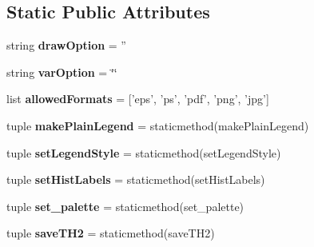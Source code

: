 \subsection*{Static Public Attributes}
\begin{CompactItemize}
\item 
\hypertarget{classtools_1_1DrawHelper_1_1Helper_4b36ab3b56f94874cb1c43e90a85695d}{
string \textbf{drawOption} = ''}
\label{classtools_1_1DrawHelper_1_1Helper_4b36ab3b56f94874cb1c43e90a85695d}

\item 
\hypertarget{classtools_1_1DrawHelper_1_1Helper_f183ed5a45610502bd5e12e7d6d8b09e}{
string \textbf{varOption} = \char`\"{}\char`\"{}}
\label{classtools_1_1DrawHelper_1_1Helper_f183ed5a45610502bd5e12e7d6d8b09e}

\item 
\hypertarget{classtools_1_1DrawHelper_1_1Helper_b198b72b77c9344732c8f06407bf02b0}{
list \textbf{allowedFormats} = \mbox{[}'eps', 'ps', 'pdf', 'png', 'jpg'\mbox{]}}
\label{classtools_1_1DrawHelper_1_1Helper_b198b72b77c9344732c8f06407bf02b0}

\item 
\hypertarget{classtools_1_1DrawHelper_1_1Helper_15871669c388b1d7217da9e5d81769bf}{
tuple \textbf{makePlainLegend} = staticmethod(makePlainLegend)}
\label{classtools_1_1DrawHelper_1_1Helper_15871669c388b1d7217da9e5d81769bf}

\item 
\hypertarget{classtools_1_1DrawHelper_1_1Helper_d72d8ee9ec066449a02e9fc961d613e4}{
tuple \textbf{setLegendStyle} = staticmethod(setLegendStyle)}
\label{classtools_1_1DrawHelper_1_1Helper_d72d8ee9ec066449a02e9fc961d613e4}

\item 
\hypertarget{classtools_1_1DrawHelper_1_1Helper_1fbe0d2943f9fac7e27ae975ece92e85}{
tuple \textbf{setHistLabels} = staticmethod(setHistLabels)}
\label{classtools_1_1DrawHelper_1_1Helper_1fbe0d2943f9fac7e27ae975ece92e85}

\item 
\hypertarget{classtools_1_1DrawHelper_1_1Helper_698e5ae1aef56438d7f6f6e90dfd2509}{
tuple \textbf{set\_\-palette} = staticmethod(set\_\-palette)}
\label{classtools_1_1DrawHelper_1_1Helper_698e5ae1aef56438d7f6f6e90dfd2509}

\item 
\hypertarget{classtools_1_1DrawHelper_1_1Helper_0f5bf8bb54364543f1e132d3cb198502}{
tuple \textbf{saveTH2} = staticmethod(saveTH2)}
\label{classtools_1_1DrawHelper_1_1Helper_0f5bf8bb54364543f1e132d3cb198502}


\end{CompactItemize}
